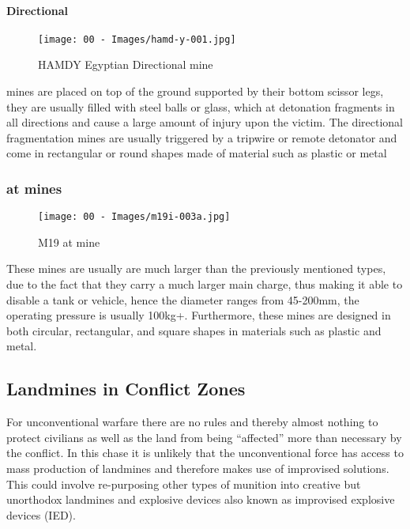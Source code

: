 \paragraph{Directional}

\begin{wrapfigure}{R}{0.5\linewidth}
\vspace{-8mm}
\centering
\texttt{[image: 00 - Images/hamd-y-001.jpg]}
  \caption{HAMDY Egyptian Directional mine \cite{hamdy}}
  \label{fig:hamdy}
\end{wrapfigure}

mines are placed on top of the ground supported by their bottom scissor legs, they are usually filled with steel balls or glass, which at detonation fragments in all directions and cause a large amount of injury upon the victim. The directional fragmentation mines are usually triggered by a tripwire or remote detonator and come in rectangular or round shapes made of material such as plastic or metal \cite{mine_detection}


\subsubsection*{\gls{at} mines} 

\begin{wrapfigure}[9]{R}{0.5\linewidth}
\vspace{-8mm}
\centering
\texttt{[image: 00 - Images/m19i-003a.jpg]}
  \caption{M19 \gls{at} mine \cite{m19}}
  \label{fig:m19}
\end{wrapfigure}

These mines are usually are much larger than the previously mentioned types, due to the fact that they carry a much larger main charge, thus making it able to disable a tank or vehicle, hence the diameter ranges from 45-200mm, the operating pressure is usually 100kg+. Furthermore, these mines are designed in both circular, rectangular, and square shapes in materials such as plastic and metal. \cite{mine_detection}

\subsection{Landmines in Conflict Zones}

For unconventional warfare there are no rules and thereby almost nothing to protect civilians as well as the land from being “affected” more than necessary by the conflict. In this chase it is unlikely that the unconventional force has access to mass production of landmines and therefore makes use of improvised solutions. This could involve re-purposing other types of munition into creative but unorthodox landmines and explosive devices also known as improvised explosive devices (IED).

